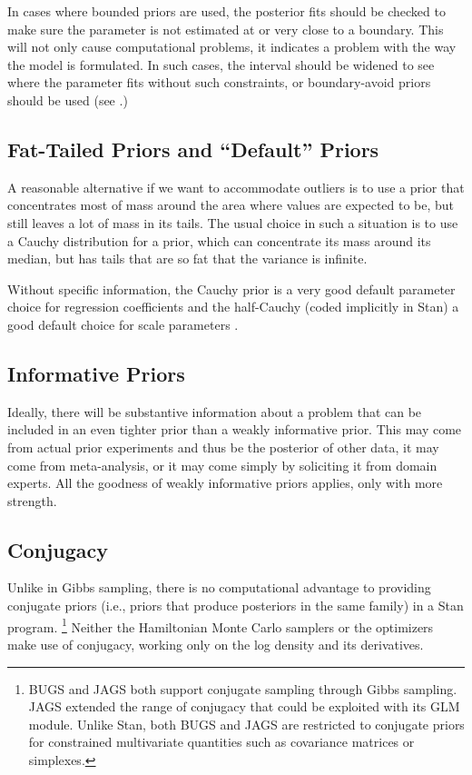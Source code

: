 In cases where bounded priors are used, the posterior fits should be
checked to make sure the parameter is not estimated at or very close
to a boundary.  This will not only cause computational problems, it
indicates a problem with the way the model is formulated.  In such
cases, the interval should be widened to see where the parameter fits
without such constraints, or boundary-avoid priors should be used (see
.)

\subsection{Fat-Tailed Priors and ``Default'' Priors}

A reasonable alternative if we want to accommodate outliers is to use a
prior that concentrates most of mass around the area where values are
expected to be, but still leaves a lot of mass in its tails.  The
usual choice in such a situation is to use a Cauchy distribution for a
prior, which can concentrate its mass around its median, but has tails
that are so fat that the variance is infinite.  

Without specific information, the Cauchy prior is a very good default
parameter choice for regression coefficients
\citep{GelmanJakulinPittauEtAl:2008} and the half-Cauchy (coded
implicitly in Stan) a good default choice for scale parameters
\citep{Gelman:2006}.



\subsection{Informative Priors}

Ideally, there will be substantive information about a problem that
can be included in an even tighter prior than a weakly informative
prior.  This may come from actual prior experiments and thus be the
posterior of other data, it may come from meta-analysis, or it may
come simply by soliciting it from domain experts.  All the goodness of
weakly informative priors applies, only with more strength.

\subsection{Conjugacy}

Unlike in Gibbs sampling, there is no computational advantage to
providing conjugate priors (i.e., priors that produce posteriors in
the same family) in a Stan program.%
%
\footnote{BUGS and JAGS both support conjugate sampling through Gibbs
  sampling.  JAGS extended the range of conjugacy that could be
  exploited with its GLM module.  Unlike Stan, both BUGS and JAGS are
  restricted to conjugate priors for constrained multivariate
  quantities such as covariance matrices or simplexes.}
%
Neither the Hamiltonian Monte Carlo samplers or the optimizers make
use of conjugacy, working only on the log density and its derivatives.



